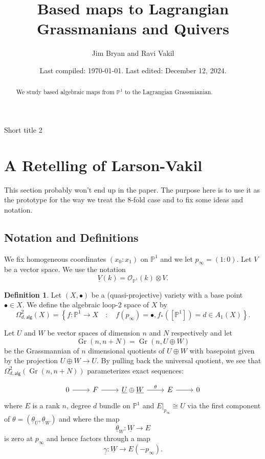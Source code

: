 \documentclass{amsart}
\title{Based maps to Lagrangian Grassmanians and Quivers}
\author{Jim Bryan and Ravi Vakil}
\date{Last compiled:  \today.  Last edited:  December 12, 2024.}
\theoremstyle{definition}
\newtheorem{definition}[theorem]{Definition}
\newcommand{\PP}{\mathbb{P}}
\newcommand{\OO}{\mathcal{O}}
\newcommand{\UL}[1]{\underline{#1}}
\newcommand{\alg}{\mathsf{alg}}
\newcommand{\Gr}{\operatorname{Gr}}
\newcommand{\LoopTwo}{\Omega^{2}_{d,\alg}}
\begin{document}
\begin{abstract}
We study based algebraic maps from $\PP^{1}$ to the Lagrangian Grassmianian.
\end{abstract}

\maketitle 

  {Short title 2}




\section{A Retelling of Larson-Vakil}

This section probably won't end up in the paper. The purpose here is
to use it as the prototype for the way we treat the 8-fold case and to
fix some ideas and notation.

\subsection{Notation and Definitions}

We fix homogeneous coordinates $(x_{0}:x_{1})$ on $\PP^{1}$ and we let
$p_{\infty }=(1:0)$. Let $V$ be a vector space. We use the notation
\[
\UL{V}(k) = \OO_{\PP^{1}}(k)\otimes V.
\]

\begin{definition}\label{defn: Omega2alg}
Let $(X,\bullet )$ be a (quasi-projective) variety with a base point
$\bullet \in X$. We define the algebraic loop-2 space of $X$ by
\[
\LoopTwo (X) = \left\{f:\PP^{1}\to X \quad :\quad
f(p_{\infty})=\bullet , f_{*}([\PP^{1}])=d\in A_{1}(X) \right\}.
\]
\end{definition}


Let $U$ and $W$ be vector spaces of dimension $n$ and $N$ respectively
and let
\[
\Gr (n,n+N) = \Gr (n,U\oplus W)
\]
be the Grassmannian of $n$ dimensional quotients of $U\oplus W$ with
basepoint given by the projection $U\oplus W\to U$. By pulling back
the universal quotient, we see that $\LoopTwo (\Gr (n,n+N))$
parameterizes exact sequences:

\[
\begin{tikzcd}
0\arrow[r]& F \arrow[r]& \UL{U}\oplus \UL{W} \arrow{r}{\theta } &E
\arrow[r]& 0
\end{tikzcd}
\]
where $E$ is a rank $n$, degree $d$ bundle on $\PP^{1}$ and
$E|_{p_{\infty}}\cong U$ via the first component of $\theta
=({\UL{\theta}_U},\UL{\theta}_{W})$ and where the map
\[
\UL{\theta }_{{W}}:\UL{W}\to E
\]
is zero at $p_{\infty}$ and hence
factors through a map
\[
\UL{\gamma} :\UL{W} \to E(-p_{\infty}).
\]
\end{document}
